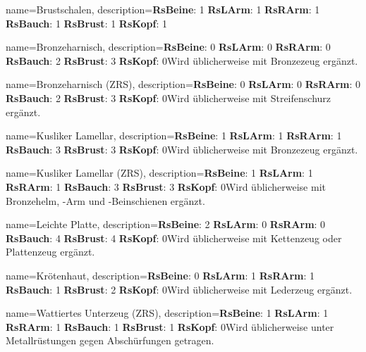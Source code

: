 {
    name={Brustschalen},
    description={\textbf{RsBeine}: 1 \textbf{RsLArm}: 1 \textbf{RsRArm}: 1 \textbf{RsBauch}: 1 \textbf{RsBrust}: 1 \textbf{RsKopf}: 1\newline }
}


{
    name={Bronzeharnisch},
    description={\textbf{RsBeine}: 0 \textbf{RsLArm}: 0 \textbf{RsRArm}: 0 \textbf{RsBauch}: 2 \textbf{RsBrust}: 3 \textbf{RsKopf}: 0\newline Wird üblicherweise mit Bronzezeug ergänzt.}
}


{
    name={Bronzeharnisch (ZRS)},
    description={\textbf{RsBeine}: 0 \textbf{RsLArm}: 0 \textbf{RsRArm}: 0 \textbf{RsBauch}: 2 \textbf{RsBrust}: 3 \textbf{RsKopf}: 0\newline Wird üblicherweise mit Streifenschurz ergänzt.}
}


{
    name={Kusliker Lamellar},
    description={\textbf{RsBeine}: 1 \textbf{RsLArm}: 1 \textbf{RsRArm}: 1 \textbf{RsBauch}: 3 \textbf{RsBrust}: 3 \textbf{RsKopf}: 0\newline Wird üblicherweise mit Bronzezeug ergänzt.}
}


{
    name={Kusliker Lamellar (ZRS)},
    description={\textbf{RsBeine}: 1 \textbf{RsLArm}: 1 \textbf{RsRArm}: 1 \textbf{RsBauch}: 3 \textbf{RsBrust}: 3 \textbf{RsKopf}: 0\newline Wird üblicherweise mit Bronzehelm, -Arm und -Beinschienen ergänzt.}
}


{
    name={Leichte Platte},
    description={\textbf{RsBeine}: 2 \textbf{RsLArm}: 0 \textbf{RsRArm}: 0 \textbf{RsBauch}: 4 \textbf{RsBrust}: 4 \textbf{RsKopf}: 0\newline Wird üblicherweise mit Kettenzeug oder Plattenzeug ergänzt.}
}


{
    name={Krötenhaut},
    description={\textbf{RsBeine}: 0 \textbf{RsLArm}: 1 \textbf{RsRArm}: 1 \textbf{RsBauch}: 1 \textbf{RsBrust}: 2 \textbf{RsKopf}: 0\newline Wird üblicherweise mit Lederzeug ergänzt.}
}


{
    name={Wattiertes Unterzeug (ZRS)},
    description={\textbf{RsBeine}: 1 \textbf{RsLArm}: 1 \textbf{RsRArm}: 1 \textbf{RsBauch}: 1 \textbf{RsBrust}: 1 \textbf{RsKopf}: 0\newline Wird üblicherweise unter Metallrüstungen gegen Abschürfungen getragen.}
}


